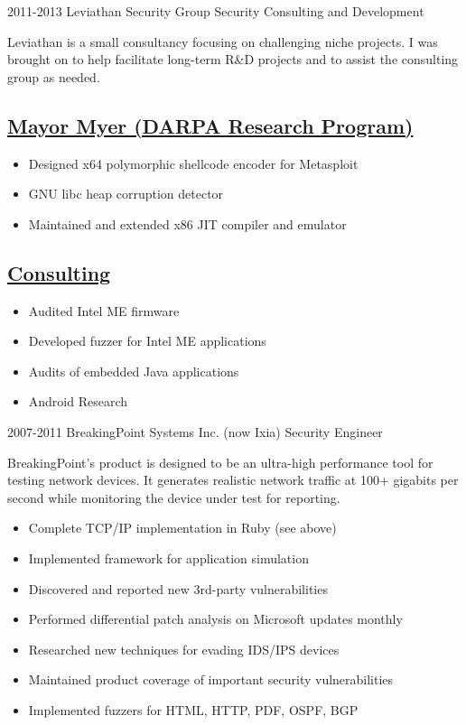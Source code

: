 \documentclass[]{friggeri-cv}
\newcommand{\heading}[1]{
  \vskip 0.05in
  \subsection{\uline{\small{#1}}}
  \vskip 0.05in
}
\begin{document}
\begin{entrylist}
{    }
  \entry
    {2011-2013}
    {Leviathan Security Group}
    {Security Consulting and Development}
    {

      Leviathan is a small consultancy focusing on challenging niche
      projects. I was brought on to help facilitate long-term R\&D
      projects and to assist the consulting group as needed.
      
      \heading{Mayor Myer (DARPA Research Program)}
      \begin{itemize}
      \item{Designed x64 polymorphic shellcode encoder for Metasploit}
      \item{GNU libc heap corruption detector}
      \item{Maintained and extended x86 JIT compiler and emulator}
      \end{itemize}
      \heading{Consulting}
      \begin{itemize}
      \item{Audited Intel ME firmware}
      \item{Developed fuzzer for Intel ME applications}
      \item{Audits of embedded Java applications}
      \item{Android Research}
      \end{itemize}
      
    }
  \entry
    {2007-2011}
    {BreakingPoint Systems Inc. (now Ixia)}
    {Security Engineer}
    {

      BreakingPoint's product is designed to be an ultra-high
      performance tool for testing network devices. It generates
      realistic network traffic at 100+ gigabits per second while
      monitoring the device under test for reporting.\\
      
      \begin{itemize}
      \item{Complete TCP/IP implementation in Ruby (see above)}
      \item{Implemented framework for application simulation}
      \item{Discovered and reported new 3rd-party vulnerabilities}
      \item{Performed differential patch analysis on Microsoft updates monthly}
      \item{Researched new techniques for evading IDS/IPS devices}
      \item{Maintained product coverage of important security vulnerabilities} 
      \item{Implemented fuzzers for HTML, HTTP, PDF, OSPF, BGP}
      \end{itemize}

}
\end{entrylist}
\end{document}
